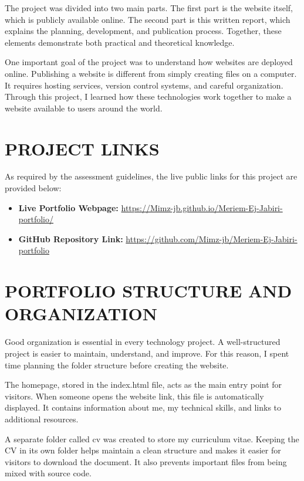 \documentclass[12pt]{article}
\begin{document}
The project was divided into two main parts. The first part is the website itself, which is publicly available online. The second part is this written report, which explains the planning, development, and publication process. Together, these elements demonstrate both practical and theoretical knowledge.

One important goal of the project was to understand how websites are deployed online. Publishing a website is different from simply creating files on a computer. It requires hosting services, version control systems, and careful organization. Through this project, I learned how these technologies work together to make a website available to users around the world.

\section*{PROJECT LINKS}
As required by the assessment guidelines, the live public links for this project are provided below:
\begin{itemize}
    \item \textbf{Live Portfolio Webpage:} \url{https://Mimz-jb.github.io/Meriem-Ej-Jabiri-portfolio/}
    \item \textbf{GitHub Repository Link:} \url{https://github.com/Mimz-jb/Meriem-Ej-Jabiri-portfolio}
\end{itemize}

\section*{PORTFOLIO STRUCTURE AND ORGANIZATION}
Good organization is essential in every technology project. A well-structured project is easier to maintain, understand, and improve. For this reason, I spent time planning the folder structure before creating the website.

The homepage, stored in the index.html file, acts as the main entry point for visitors. When someone opens the website link, this file is automatically displayed. It contains information about me, my technical skills, and links to additional resources.

A separate folder called cv was created to store my curriculum vitae. Keeping the CV in its own folder helps maintain a clean structure and makes it easier for visitors to download the document. It also prevents important files from being mixed with source code.
\end{document}
